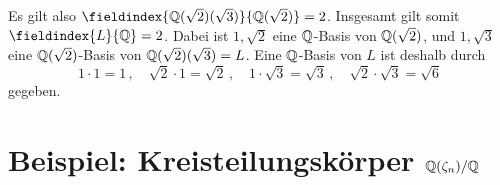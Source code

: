 Es gilt also $\fieldindex{\Rational(\sqrt{2})(\sqrt{3})}{\Rational(\sqrt{2})} = 2$.
Insgesamt gilt somit $\fieldindex{L}{\Rational} = 2$.
Dabei ist $1, \sqrt{2}$ eine $\mathbb{Q}$-Basis von $\mathbb{Q}(\sqrt{2})$, und $1, \sqrt{3}$ eine $\mathbb{Q}(\sqrt{2})$-Basis von $\mathbb{Q}(\sqrt{2})(\sqrt{3}) = L$.
Eine $\mathbb{Q}$-Basis von $L$ ist deshalb durch
\[
  1         \cdot 1         = 1 \,,
  \quad
  \sqrt{2}  \cdot 1         = \sqrt{2}  \,,
  \quad
  1         \cdot \sqrt{3}  = \sqrt{3}  \,,
  \quad
  \sqrt{2}  \cdot \sqrt{3}  = \sqrt{6}
\]
gegeben.














\section{Beispiel: Kreisteilungskörper \texorpdfstring{$\mathbb{Q}(\zeta_n)/\mathbb{Q}$}{Q(zeta\_n)/Q}}

